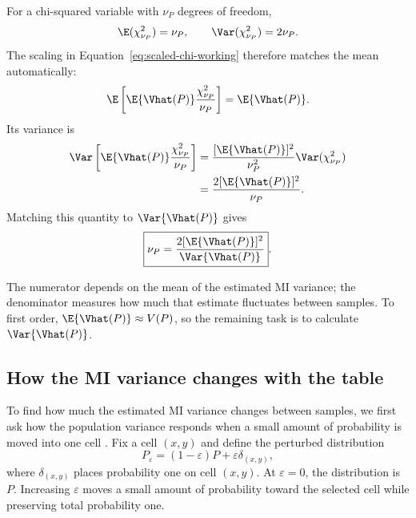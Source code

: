For a chi-squared variable with \(\nu_P\) degrees of freedom,
\begin{equation}
  \E(\chi^2_{\nu_P})=\nu_P,
  \qquad
  \Var(\chi^2_{\nu_P})=2\nu_P.
\end{equation}
The scaling in Equation~\eqref{eq:scaled-chi-working} therefore matches the
mean automatically:
\begin{equation}
  \E\left[
  \E\{\Vhat(P)\}\frac{\chi^2_{\nu_P}}{\nu_P}
  \right]
  =\E\{\Vhat(P)\}.
\end{equation}
Its variance is
\begin{align}
  \Var\left[
  \E\{\Vhat(P)\}\frac{\chi^2_{\nu_P}}{\nu_P}
  \right]
  &=
  \frac{[\E\{\Vhat(P)\}]^2}{\nu_P^2}
  \Var(\chi^2_{\nu_P})\\
  &=
  \frac{2[\E\{\Vhat(P)\}]^2}{\nu_P}.
\end{align}
Matching this quantity to \(\Var\{\Vhat(P)\}\) gives
\begin{equation}
  \boxed{
  \nu_P
  =
  \frac{2[\E\{\Vhat(P)\}]^2}
       {\Var\{\Vhat(P)\}}
  }.
  \label{eq:component-df-moments}
\end{equation}
\begin{samepage}%
The numerator depends on the mean of the estimated MI variance; the
denominator measures how much that estimate fluctuates between samples.
To first order, \(\E\{\Vhat(P)\}\approx V(P)\), so the remaining task is
to calculate \(\Var\{\Vhat(P)\}\).
\par
\end{samepage}

\begin{samepage}
\section{How the MI variance changes with the table}

To find how much the estimated MI variance changes between samples, we first
ask how the population variance responds when a small amount of probability
is moved into one cell \citep{hampel1974,vanderVaart1998}. Fix a cell
\((x,y)\) and define the perturbed distribution
\begin{equation}
  P_\varepsilon
  =(1-\varepsilon)P+\varepsilon\delta_{(x,y)},
  \label{eq:contamination-path}
\end{equation}
where \(\delta_{(x,y)}\) places probability one on cell \((x,y)\). At
\(\varepsilon=0\), the distribution is \(P\). Increasing \(\varepsilon\)
moves a small amount of probability toward the selected cell while preserving
total probability one.
\par
\end{samepage}

